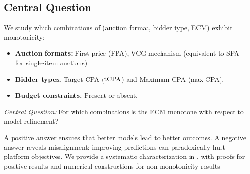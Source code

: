 \subsection{Central Question}
\label{subsec:main_question}

We study which combinations of (auction format, bidder type, ECM) exhibit monotonicity:
\begin{itemize}
    \item \textbf{Auction formats:} First-price (FPA), VCG mechanism (equivalent to SPA for single-item auctions).
    \item \textbf{Bidder types:} Target CPA ($\text{tCPA}$) and Maximum CPA (max-CPA).
    \item \textbf{Budget constraints:} Present or absent.
\end{itemize}

\emph{Central Question:} For which combinations is the ECM monotone with respect to model refinement?

A positive answer ensures that better models lead to better outcomes. A negative answer reveals misalignment: improving predictions can paradoxically hurt platform objectives. We provide a systematic characterization in , with proofs for positive results and numerical constructions for non-monotonicity results.

